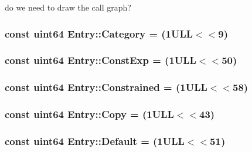 do we need to draw the call graph? 

\hypertarget{class_entry_aa6c8050991d37fb7c7f56f50399c75c2}{}
\subsubsection[{Category}]{\setlength{\rightskip}{0pt plus 5cm}const {\bf uint64} Entry\+::\+Category = (1\+U\+L\+L$<$$<$9)\hspace{0.3cm}{\ttfamily [static]}}\label{class_entry_aa6c8050991d37fb7c7f56f50399c75c2}
\hypertarget{class_entry_ada4aaba5fbbbf54141b2eb9eec393b17}{}
\subsubsection[{Const\+Exp}]{\setlength{\rightskip}{0pt plus 5cm}const {\bf uint64} Entry\+::\+Const\+Exp = (1\+U\+L\+L$<$$<$50)\hspace{0.3cm}{\ttfamily [static]}}\label{class_entry_ada4aaba5fbbbf54141b2eb9eec393b17}
\hypertarget{class_entry_a025979519b66924ba3cc1de357998f1f}{}
\subsubsection[{Constrained}]{\setlength{\rightskip}{0pt plus 5cm}const {\bf uint64} Entry\+::\+Constrained = (1\+U\+L\+L$<$$<$58)\hspace{0.3cm}{\ttfamily [static]}}\label{class_entry_a025979519b66924ba3cc1de357998f1f}
\hypertarget{class_entry_a4e1e6da7b39bc64723ee35d131e28e15}{}
\subsubsection[{Copy}]{\setlength{\rightskip}{0pt plus 5cm}const {\bf uint64} Entry\+::\+Copy = (1\+U\+L\+L$<$$<$43)\hspace{0.3cm}{\ttfamily [static]}}\label{class_entry_a4e1e6da7b39bc64723ee35d131e28e15}
\hypertarget{class_entry_ad07a0f209289d0375b5740a58fdb3208}{}
\subsubsection[{Default}]{\setlength{\rightskip}{0pt plus 5cm}const {\bf uint64} Entry\+::\+Default = (1\+U\+L\+L$<$$<$51)\hspace{0.3cm}{\ttfamily [static]}}\label{class_entry_ad07a0f209289d0375b5740a58fdb3208}
\hypertarget{class_entry_a7acc394a520d7dbc506a434baa11b2ff}{}
